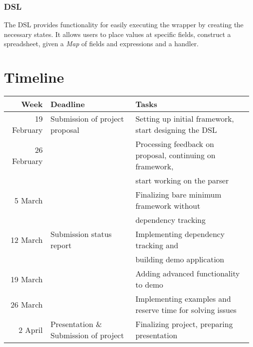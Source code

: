 \documentclass{article}
\begin{document}
\subsubsection{DSL}
	The DSL provides functionality for easily executing the wrapper by creating the necessary states. It allows users to place values at specific fields, construct a spreadsheet, given a \textit{Map} of fields and expressions and a handler.
	
	\section{Timeline}
		\begin{tabular}{|r|l|l|} \hline
			Week & Deadline &Tasks \footnotemark  \\ \hline \hline
			19 February & Submission of project proposal & Setting up initial framework, start designing the DSL\\ \hline
			26 February &  & Processing feedback on proposal, continuing on framework,\\
			 & & start working on the parser \\ \hline
			5 March & & Finalizing bare minimum framework without \\
			 & & dependency tracking \\ \hline
			12 March & Submission status report & Implementing dependency tracking and \\
			 & & building demo application\\ \hline
			19 March & & Adding advanced functionality to demo\\ \hline
			26 March & & Implementing examples and reserve time for solving issues\\ \hline
			2 April & Presentation \& Submission of project & Finalizing project, preparing presentation\\ \hline
			
		\end{tabular}
\end{document}

